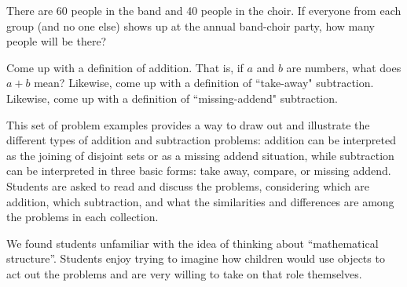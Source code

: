 \documentclass{ximera}
\begin{document}
\begin{problem}
There are 60 people in the band and 40 people in the choir.  If everyone from each group (and no one else) shows up at the annual band-choir party, how many people will be there?
\end{problem}

\begin{problem} \label{AddingUpSummary}
 Come up with a definition of addition.  That is, if $a$ and $b$ are numbers, what does $a + b$ mean?  Likewise, come up with a definition of ``take-away" subtraction.  Likewise, come up with a definition of ``missing-addend" subtraction.  
\end{problem}


\newpage
\begin{instructorNotes}
This set of problem examples provides a way to draw out and illustrate the different types of addition and subtraction problems:  addition can be interpreted as the joining of disjoint sets or as a missing addend situation, while subtraction can be interpreted in three basic forms: take away, compare, or missing addend.  Students are asked to read and discuss the problems, considering which are addition, which subtraction, and what the similarities and differences are among the problems in each collection.

We found students unfamiliar with the idea of thinking about ``mathematical structure''.  Students enjoy trying to imagine how children would use objects to act out the problems and are very willing to take on that role themselves.



\end{instructorNotes}
\end{document}
